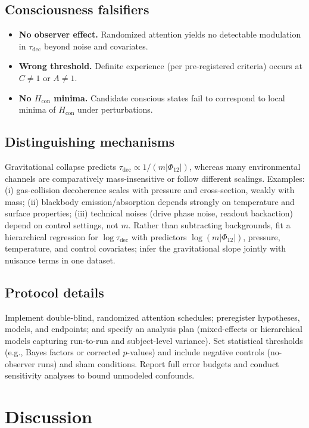 \documentclass[reprint,aps,prd,nofootinbib]{revtex4-2}
\begin{document}
\subsection{Consciousness falsifiers}
\begin{itemize}
  \item \textbf{No observer effect.} Randomized attention yields no detectable modulation in $\tau_{\mathrm{dec}}$ beyond noise and covariates.
  \item \textbf{Wrong threshold.} Definite experience (per pre-registered criteria) occurs at $C\neq 1$ or $A\neq 1$.
  \item \textbf{No $H_{\mathrm{con}}$ minima.} Candidate conscious states fail to correspond to local minima of $H_{\mathrm{con}}$ under perturbations.
\end{itemize}

\subsection{Distinguishing mechanisms}
Gravitational collapse predicts $\tau_{\mathrm{dec}}\propto 1/(m|\Phi_{12}|)$, whereas many environmental channels are comparatively mass-insensitive or follow different scalings. Examples: (i) gas-collision decoherence scales with pressure and cross-section, weakly with mass; (ii) blackbody emission/absorption depends strongly on temperature and surface properties; (iii) technical noises (drive phase noise, readout backaction) depend on control settings, not $m$. Rather than subtracting backgrounds, fit a hierarchical regression for $\log \tau_{\mathrm{dec}}$ with predictors $\log(m|\Phi_{12}|)$, pressure, temperature, and control covariates; infer the gravitational slope jointly with nuisance terms in one dataset.

\subsection{Protocol details}
Implement double-blind, randomized attention schedules; preregister hypotheses, models, and endpoints; and specify an analysis plan (mixed-effects or hierarchical models capturing run-to-run and subject-level variance). Set statistical thresholds (e.g., Bayes factors or corrected $p$-values) and include negative controls (no-observer runs) and sham conditions. Report full error budgets and conduct sensitivity analyses to bound unmodeled confounds.

\section{Discussion}
\label{sec:discussion}
\end{document}

